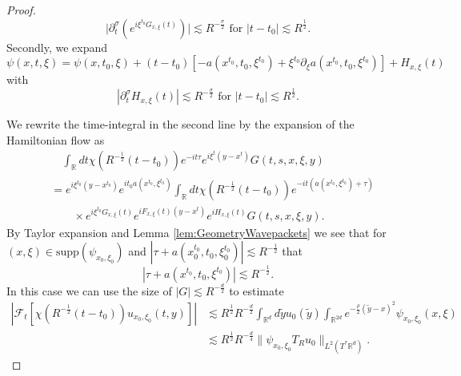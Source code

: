 \documentclass{amsart}
\theoremstyle{definition}
\newcommand{\R}{\mathbb{R}}
\begin{document}
\begin{proof}
\begin{equation}
\label{eq:TimeRegularityPhaseFunctionII}
\big| \partial_t^{\sigma} (e^{i \xi^{t_0} G_{x,\xi}(t)}) \big| \lesssim R^{-\frac{\sigma}{2}} \text{ for } |t-t_0| \lesssim R^{\frac{1}{2}}.
\end{equation}
Secondly, we expand
\begin{equation*}
    \psi(x,t,\xi) = \psi(x,t_0,\xi) + (t-t_0)[-a(x^{t_0},t_0,\xi^{t_0}) + \xi^{t_0} \partial_{\xi} a(x^{t_0},t_0,\xi^{t_0})] + H_{x,\xi}(t)
\end{equation*}
with
\begin{equation*}
    |\partial_t^{\sigma} H_{x,\xi}(t)| \lesssim R^{-\frac{\sigma}{2}} \text{ for } |t-t_0| \lesssim R^{\frac{1}{2}}.
\end{equation*}

We rewrite the time-integral in the second line by the expansion of the Hamiltonian flow as
\begin{equation*}
\begin{split}
&\quad \int_{\R} dt \chi(R^{-\frac{1}{2}}(t-t_0)) e^{-it \tau} e^{i \xi^t (y-x^t)} G(t,s,x,\xi,y) \\
&= e^{i \xi^{t_0} (y-x^{t_0})} e^{i t_0 a(x^{t_0},\xi^{t_0})} \int_{\R} dt \chi(R^{-\frac{1}{2}}(t-t_0)) e^{-i t (a(x^{t_0}, \xi^{t_0}) + \tau)} \\
&\quad \quad \times e^{i \xi^{t_0} G_{x,\xi}(t)} e^{i F_{x,\xi}(t)(y-x^t)} e^{i H_{x,\xi}(t)} G(t,s,x,\xi,y).
\end{split}
\end{equation*}
By Taylor expansion and Lemma \ref{lem:GeometryWavepackets} we see that for $(x,\xi) \in \text{supp}(\psi_{x_0,\xi_0})$ and $|\tau + a(x_0^{t_0},t_0,\xi_0^{t_0})| \lesssim R^{-\frac{1}{2}}$ that
\begin{equation*}
| \tau + a(x^{t_0},t_0,\xi^{t_0})| \lesssim R^{-\frac{1}{2}}.
\end{equation*}
In this case we can use the size of $|G| \lesssim R^{-\frac{d}{2}}$ to estimate
\begin{equation*}
\begin{split}
|\mathcal{F}_t[\chi(R^{-\frac{1}{2}}(t-t_0)) u_{x_0,\xi_0}(t,y)] | &\lesssim R^{\frac{1}{2}} R^{-\frac{d}{2}} \int_{\R^d} d\tilde{y} u_0(\tilde{y}) \int_{\R^{2d}} e^{-\frac{\rho}{2}(\tilde{y}-x)^2} \psi_{x_0,\xi_0}(x,\xi) \\
&\lesssim R^{\frac{1}{2}} R^{-\frac{d}{4}} \| \psi_{x_0,\xi_0} T_R u_0 \|_{L^2(T^* \R^d)}.
\end{split}
\end{equation*}


\end{proof}
\end{document}
